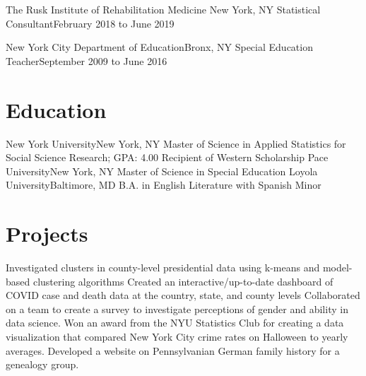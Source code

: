 \documentclass[letterpaper,11pt]{article}
\begin{document}
	\resumeSubheading
	{The Rusk Institute of Rehabilitation Medicine} {New York, NY}
	{Statistical Consultant}{February 2018 to June 2019}
		\resumeItemListStart
		\resumeItemListEnd
	
	\resumeSubheading
	{New York City Department of Education}{Bronx, NY}
	{Special Education Teacher}{September 2009 to June 2016}
		\resumeItemListStart
		\resumeItemListEnd
	\resumeSubHeadingListEnd

\section{Education}
	\resumeSubHeadingListStart
   		\resumeSubheadingAward
      		{New York University}{New York, NY}
      		{Master of Science in Applied Statistics for Social Science Research;  GPA: 4.00}{}
      		{Recipient of Western Scholarship}{}
      	\resumeSubheading
      		{Pace University}{New York, NY}
      		{Master of Science in Special Education} {}
      	\resumeSubheading
      		{Loyola University}{Baltimore, MD}
      		{B.A. in English Literature with Spanish Minor}{}
    \resumeSubHeadingListEnd

\section{Projects}
\resumeItemListStart
				 {Investigated clusters in county-level presidential data using k-means and model-based clustering algorithms}
				 {Created an interactive/up-to-date dashboard of COVID case and death data at the country,  state,  and county levels}
				{Collaborated on a team to create a survey to investigate perceptions of gender and ability in data science.}
				 {Won an award from the NYU Statistics Club for creating a data visualization that compared New York City crime rates on Halloween to yearly averages.}
				{Developed a website on Pennsylvanian German family history for a genealogy group.}
\resumeItemListEnd
\end{document}

